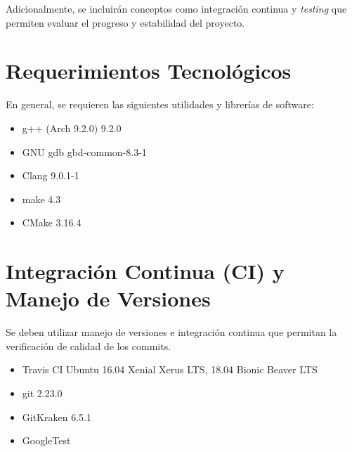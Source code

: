 \documentclass[letterpaper]{scrreprt}
\begin{document}
Adicionalmente, se incluirán conceptos como integración continua y \emph{testing} que permiten evaluar el progreso y estabilidad del proyecto.

\section{Requerimientos Tecnológicos}
En general, se requieren las siguientes utilidades y librerías de software:
\begin{itemize}

	\item g++ (Arch 9.2.0) 9.2.0

	\item GNU gdb gbd-common-8.3-1

	\item Clang 9.0.1-1

	\item make 4.3

	\item CMake 3.16.4

\end{itemize}
\section{Integración Continua (CI) y Manejo de Versiones}
Se deben utilizar manejo de versiones e integración continua que permitan la verificación de calidad de los commits.

\begin{itemize}
	 \item Travis CI Ubuntu 16.04 Xenial Xerus LTS, 18.04 Bionic Beaver LTS
	 \item git 2.23.0
	 \item GitKraken 6.5.1
	 \item GoogleTest
\end{itemize}


%
%
\end{document}
